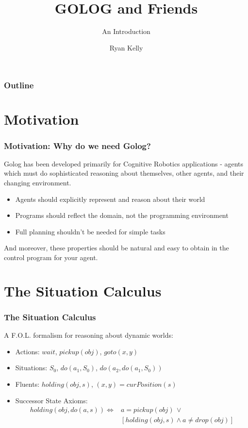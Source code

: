 \documentclass{beamer}
\title{GOLOG and Friends}
\subtitle{An Introduction}
\author{Ryan Kelly}
\begin{document}
\begin{frame}
  \titlepage
\end{frame}

\begin{frame}
  \frametitle{Outline}
  \tableofcontents
\end{frame}

\section{Motivation}

\begin{frame}
\frametitle{Motivation: Why do we need Golog?}
Golog has been developed primarily for Cognitive Robotics applications - agents
which must do sophisticated reasoning about themselves, other agents, and their
changing environment.
\begin{itemize}
\item Agents should explicitly represent and reason about their world
\item Programs should reflect the domain, not the programming environment
\item Full planning shouldn't be needed for simple tasks
\end{itemize}
And moreover, these properties should be natural and easy to obtain in the
control program for your agent.
\end{frame}


\section{The Situation Calculus}

\begin{frame}
\frametitle{The Situation Calculus}

A F.O.L. formalism for reasoning about dynamic worlds:

\begin{itemize}
\pause
\item Actions: $wait$, $pickup(obj)$, $goto(x,y)$
\pause
\item Situations: $S_{0}$, $do(a_{1},S_{0})$, $do(a_{2},do(a_{1},S_{0}))$
\pause
\item Fluents: $holding(obj,s)$, $(x,y)=curPosition(s)$
\pause
\item Successor State Axioms:\[
\begin{array}{cc}
holding(obj,do(a,s))\iff & a=pickup(obj)\,\vee\\
 & \left[holding(obj,s)\wedge a\neq drop(obj)\right]\end{array}\]
\end{itemize}

\end{frame}
\end{document}
